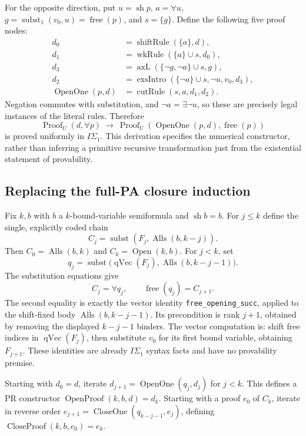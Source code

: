 For the opposite direction, put $u=\operatorname{sh}p$,
$a=\forall u$, $g=\operatorname{subst}_1(v_0,u)=\operatorname{free}(p)$,
and $s=\{g\}$.  Define the following five proof nodes:
\begin{align*}
 d_0&=\operatorname{shiftRule}(\{a\},d),\\
 d_1&=\operatorname{wkRule}(\{a\}\cup s,d_0),\\
 d_3&=\operatorname{axL}(\{\neg g,\neg a\}\cup s,g),\\
 d_2&=\operatorname{exsIntro}(\{\neg a\}\cup s,\neg u,v_0,d_3),\\
 \operatorname{OpenOne}(p,d)&=\operatorname{cutRule}(s,a,d_1,d_2).
\end{align*}
Negation commutes with substitution, and $\neg a=\exists\neg u$,
so these are precisely legal instances of the literal rules.  Therefore
\[
 \operatorname{Proof}_U(d,\forall p)
 \ \longrightarrow\ \operatorname{Proof}_U(\operatorname{OpenOne}(p,d),\operatorname{free}(p))
                                                               \tag{O1}
\]
is proved uniformly in $I\Sigma_1$.  This derivation specifies the
numerical constructor, rather than inferring a primitive recursive
transformation just from the existential statement of provability.

\subsection{Replacing the full-PA closure induction}

Fix $k,b$ with $b$ a $k$-bound-variable semiformula and
$\operatorname{sh}b=b$.  For $j\le k$ define the single, explicitly
coded chain
\[
 C_j=\operatorname{subst}(F_j,\operatorname{Alls}(b,k-j)).
\]
Then $C_0=\operatorname{Alls}(b,k)$ and $C_k=\operatorname{Open}(k,b)$.
For $j<k$, set
\[
 q_j=\operatorname{subst}\bigl(\operatorname{qVec}(F_j),
                    \operatorname{Alls}(b,k-j-1)\bigr).
\]
The substitution equations give
\[
 C_j=\forall q_j,\qquad \operatorname{free}(q_j)=C_{j+1}. \tag{Chain}
\]
The second equality is exactly the vector identity
\texttt{free\_opening\_succ}, applied to the shift-fixed body
$\operatorname{Alls}(b,k-j-1)$.  Its precondition is rank $j+1$,
obtained by removing the displayed $k-j-1$ binders.  The vector computation
is: shift free indices in $\operatorname{qVec}(F_j)$, then substitute
$v_0$ for its first bound variable, obtaining $F_{j+1}$.
These identities are already $I\Sigma_1$ syntax facts and have no
provability premise.

Starting with $d_0=d$, iterate
$d_{j+1}=\operatorname{OpenOne}(q_j,d_j)$ for $j<k$.
This defines a PR constructor $\operatorname{OpenProof}(k,b,d)=d_k$.
Starting with a proof $e_0$ of $C_k$, iterate in reverse order
$e_{j+1}=\operatorname{CloseOne}(q_{k-j-1},e_j)$, defining
$\operatorname{CloseProof}(k,b,e_0)=e_k$.

